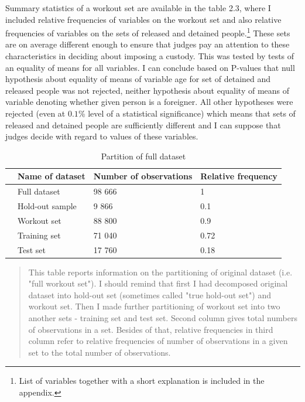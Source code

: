 \documentclass[12pt, twoside]{book} %
\begin{document}
Summary statistics of a workout set are available in the table 2.3, where I included relative frequencies of variables on the workout set and also relative frequencies of variables on the sets of released and detained people.\footnote{List of variables together with a short explanation is included in the appendix.} These sets are on average different enough to ensure that judges pay an attention to these characteristics in deciding about imposing a custody. This was tested by tests of an equality of means for all variables. I can conclude based on P-values that null hypothesis about equality of means of variable age for set of detained and released people was not rejected, neither hypothesis about equality of means of variable denoting whether given person is a foreigner. All other hypotheses were rejected (even at $0.1$\% level of a statistical significance) which means that sets of released and detained people are sufficiently different and I can suppose that judges decide with regard to values of these variables.\newline




\begin{table}[t]
\centering
\begin{tabular}{rlll}
  \hline
 & Name of dataset & Number of observations & Relative frequency\\ 
  \hline
 & Full dataset & 98 666 & 1 \\ 
  & Hold-out sample & 9 866 & 0.1 \\ 
   & Workout set & 88 800 & 0.9 \\ 
   & 	\hspace{1cm}Training set & 71 040 & 0.72 \\ 
  & 	\hspace{1cm}Test set & 17 760 & 0.18 \\ 
      \hline
\end{tabular}

\caption{Partition of full dataset}
\medskip
{\small
\begin{quotation}
 This table reports information on the partitioning of original dataset (i.e. "full workout set"). I should remind that first I had decomposed original dataset into hold-out set (sometimes called "true hold-out set") and workout set. Then I made further partitioning of workout set into two another sets - training set and test set. Second column gives total numbers of observations in a set. Besides of that, relative frequencies in third column refer to relative frequencies of number of observations in a given set to the total number of observations. 
\end{quotation}
}

\end{table}
\end{document}

